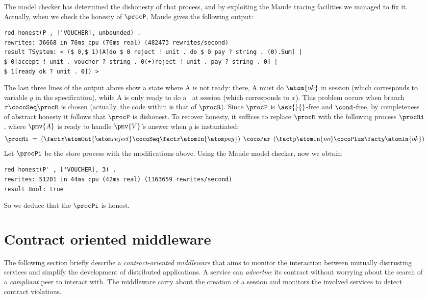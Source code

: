 The model checker has determined the dishonesty of that process, 
and by exploiting the Maude tracing facilities we managed to fix it.
Actually, when we check the honesty of $\procP$, 
Maude gives the following output:
\begin{lstlisting}
red honest(P , ['VOUCHER], unbounded) .
rewrites: 36668 in 76ms cpu (76ms real) (482473 rewrites/second)
result TSystem: < ($ 0,$ 1)(A[do $ 0 reject ! unit . do $ 0 pay ? string . (0).Sum] |
$ 0[accept ! unit . voucher ? string . 0(+)reject ! unit . pay ? string . 0] | 
$ 1[ready ok ? unit . 0]) >
\end{lstlisting}
The last three lines of the output above show a state where {\pmv A} is not ready:
there, {\pmv A} must do $\atom{ok}$ in session \mbox{}
(which corresponds to variable $y$ in the \coco specification),
while {\pmv A} is only ready to do a \rj\ at session  
(which corresponds to $x$).
This problem occurs when branch $\tau \cocoSeq \procR$ is chosen
(actually, the code within  is that of $\procR$).
Since $\procP$ is $\ask{}{}$-free and $\cond$-free, by completeness
of abstract honesty it follows that $\procP$ is dishonest.
%
To recover honesty, it suffices to replace $\procR$ with the following process $\procRi$, %
where $\pmv{A}$ is ready to handle $\pmv{V}$'s answer when $y$ is instantiated:
\[
\procRi
\; = \;
\left(
\fact x {\atomOut{\rj}} 
\cocoSeq
\fact x {\atomIn{\p}}
\right)
\; \cocoPar \;
\left(
\fact y {\atomIn{no}}
\cocoPlus
\fact y {\atomIn{ok}}
\right)
\]
Let $\procPi$ be the store process with the modifications above.
Using the Maude model checker, now we obtain:
\begin{lstlisting}
red honest(P' , ['VOUCHER], 3) .
rewrites: 51201 in 44ms cpu (42ms real) (1163659 rewrites/second)
result Bool: true
\end{lstlisting}
So we deduce that the $\procPi$ is honest.


\section{Contract oriented middleware}\label{sec:co2-middleware}
The following section briefly describe a \textit{contract-oriented middleware} \cite{CO2middleware} that aims to monitor the interaction between mutually distrusting services and simplify the development of distributed applications.
A service can \textit{advertise} its contract without worrying about the search of a \textit{compliant} peer to interact with. The middleware carry about the creation of a session and monitors the involved services to detect contract violations.

